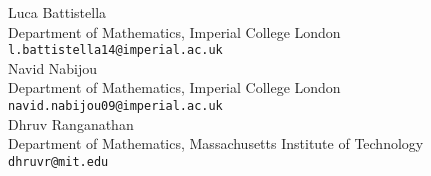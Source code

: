 \documentclass[11pt]{amsart}
\theoremstyle{definition}
\theoremstyle{definition}
\begin{document}



\bigskip\bigskip

\noindent Luca Battistella\\
Department of Mathematics, Imperial College London \\
\texttt{l.battistella14@imperial.ac.uk}\\

\noindent Navid Nabijou \\
Department of Mathematics, Imperial College London \\
\texttt{navid.nabijou09@imperial.ac.uk}\\

\noindent Dhruv Ranganathan \\
Department of Mathematics, Massachusetts Institute of Technology \\
\texttt{dhruvr@mit.edu}
\end{document}
